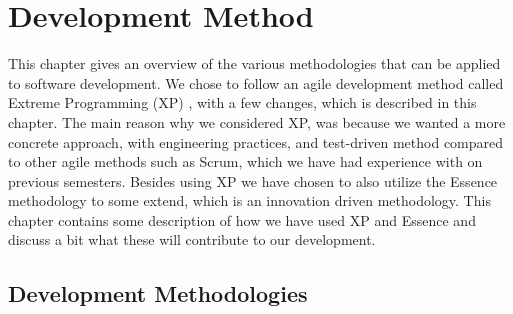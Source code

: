 
\chapter{Development Method}
\label{cha:development_method}

This chapter gives an overview of the various methodologies that can be applied to software development. We chose to follow an agile development method called Extreme Programming (XP) \parencite{xp}, with a few changes, which is described in this chapter. The main reason why we considered XP, was because we wanted a more concrete approach, with engineering practices, and test-driven method compared to other agile methods such as Scrum, which we have had experience with on previous semesters. Besides using XP we have chosen to also utilize the Essence methodology \parencite{essence_book} to some extend, which is an innovation driven methodology. This chapter contains some description of how we have used XP and Essence and discuss a bit what these will contribute to our development.

\section{Development Methodologies}
\label{sec:development_methodologies}

